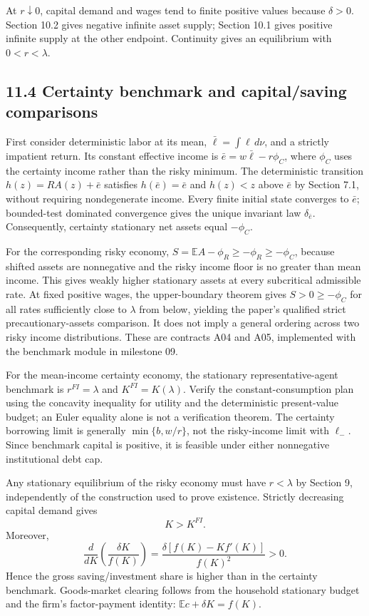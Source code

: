 \documentclass[
  11pt,
]{article}
\begin{document}
At \(r\downarrow0\), capital demand and wages tend to finite positive
values because \(\delta>0\). Section 10.2 gives negative infinite asset
supply; Section 10.1 gives positive infinite supply at the other
endpoint. Continuity gives an equilibrium with \(0<r<\lambda\).

\subsection{11.4 Certainty benchmark and capital/saving
comparisons}\label{certainty-benchmark-and-capitalsaving-comparisons}

First consider deterministic labor at its mean,
\(\bar\ell=\int\ell\,d\nu\), and a strictly impatient return. Its
constant effective income is \(\bar e=w\bar\ell-r\phi_C\), where
\(\phi_C\) uses the certainty income rather than the risky minimum. The
deterministic transition \(h(z)=RA(z)+\bar e\) satisfies
\(h(\bar e)=\bar e\) and \(h(z)<z\) above \(\bar e\) by Section 7.1,
without requiring nondegenerate income. Every finite initial state
converges to \(\bar e\); bounded-test dominated convergence gives the
unique invariant law \(\delta_{\bar e}\). Consequently, certainty
stationary net assets equal \(-\phi_C\).

For the corresponding risky economy,
\(S=\mathbb EA-\phi_R\geq-\phi_R\geq-\phi_C\), because shifted assets
are nonnegative and the risky income floor is no greater than mean
income. This gives weakly higher stationary assets at every subcritical
admissible rate. At fixed positive wages, the upper-boundary theorem
gives \(S>0\geq-\phi_C\) for all rates sufficiently close to \(\lambda\)
from below, yielding the paper's qualified strict precautionary-assets
comparison. It does not imply a general ordering across two risky income
distributions. These are contracts A04 and A05, implemented with the
benchmark module in milestone 09.

For the mean-income certainty economy, the stationary
representative-agent benchmark is \(r^{FI}=\lambda\) and
\(K^{FI}=K(\lambda)\). Verify the constant-consumption plan using the
concavity inequality for utility and the deterministic present-value
budget; an Euler equality alone is not a verification theorem. The
certainty borrowing limit is generally \(\min\{b,w/r\}\), not the
risky-income limit with \(\ell_-\). Since benchmark capital is positive,
it is feasible under either nonnegative institutional debt cap.

Any stationary equilibrium of the risky economy must have \(r<\lambda\)
by Section 9, independently of the construction used to prove existence.
Strictly decreasing capital demand gives \[
K>K^{FI}.
\] Moreover, \[
\frac{d}{dK}\left(\frac{\delta K}{f(K)}\right)
=\frac{\delta[f(K)-Kf'(K)]}{f(K)^2}>0.
\] Hence the gross saving/investment share is higher than in the
certainty benchmark. Goods-market clearing follows from the household
stationary budget and the firm's factor-payment identity:
\(\mathbb Ec+\delta K=f(K)\).
\end{document}
